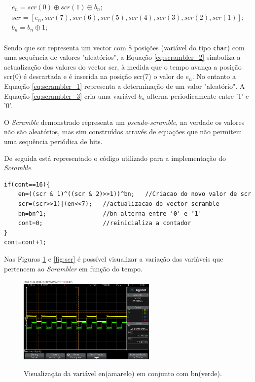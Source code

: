 \documentclass[11pt]{article}
\numberwithin{equation}{section}
\begin{document}
\begin{gather}
e_n=scr(0) \oplus scr(1) \oplus b_n; \\
\label{eq:scrambler_1}
scr=[e_n, scr(7), scr(6), scr(5), scr(4), scr(3), scr(2), scr(1)];\\
\label{eq:scrambler_2}
b_n=b_n \oplus 1;\\
\label{eq:scrambler_3}
\end{gather}

Sendo que scr representa um vector com 8 posições (variável do tipo \texttt{char}) com uma sequência de valores "aleatórios", a Equação \ref{eq:scrambler_2} simboliza a actualização dos valores do vector scr, à medida que o tempo avança a posição scr(0) é descartada e é inserida na posição scr(7) o valor de $ e_n $. No entanto a Equação \ref{eq:scrambler_1} representa a determinação de um valor "aleatório". A Equação \ref{eq:scrambler_3} cria uma variável $ b_n $ alterna periodicamente entre '1' e '0'.

O \textit{Scramble} demonstrado representa um \textit{pseudo-scramble}, na verdade os valores não são aleatórios, mas sim construídos através de equações que não permitem uma sequência periódica de bits.

De seguida está representado o código utilizado para a implementação do \textit{Scramble}.

\begin{lstlisting}
if(cont==16){
	en=((scr & 1)^((scr & 2)>>1))^bn;   //Criacao do novo valor de scr
	scr=(scr>>1)|(en<<7);	//actualizacao do vector scramble
	bn=bn^1;				//bn alterna entre '0' e '1'
	cont=0;					//reinicializa a contador
}
cont=cont+1;
\end{lstlisting}

Nas Figuras \ref{fig:en_bn} e \ref{fig:scr} é possível visualizar a variação das variáveis que pertencem ao \textit{Scrambler} em função do tempo.

\begin{figure}[H]
	\centering
	\includegraphics[width=0.6\textwidth]{./en_bn}~\\
	\caption{Visualização da variável en(amarelo) em conjunto com bn(verde).}
	\label{fig:en_bn}
\end{figure}
\end{document}
